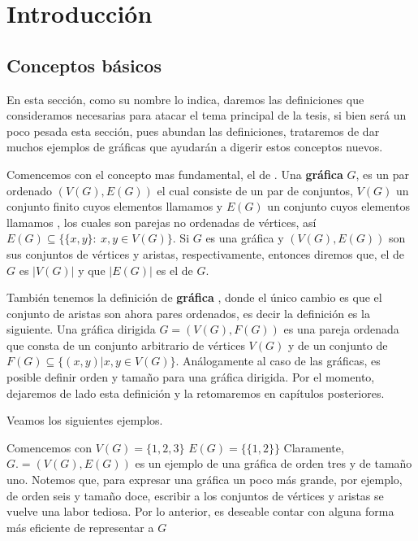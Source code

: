 \chapter{Introducci\'on}

\section{Conceptos básicos}
\label{sec:Cncpts bscs}

En esta sección, como su nombre lo indica, daremos las definiciones que consideramos necesarias para atacar el tema principal de la tesis, si bien será un poco pesada esta sección, pues abundan las definiciones, trataremos de dar muchos ejemplos de gráficas que ayudarán a digerir estos conceptos nuevos.

Comencemos con el concepto mas fundamental, el de .
Una \textbf{gr\'afica}  $G$, es un par ordenado $(V(G), E(G))$ el cual consiste de un par de conjuntos, $V(G)$ un conjunto finito cuyos elementos llamamos  y $E(G)$ un conjunto cuyos elementos llamamos , los cuales son parejas no ordenadas de vértices, así $E(G)\subseteq \{ \{x,y\} \colon\ x,y\in V(G) \}$.  Si $G$ es una gráfica y $(V(G),E(G))$ son sus conjuntos de vértices y aristas, respectivamente, entonces diremos que, el  de $G$ es $|V(G)|$ y que $|E(G)|$ es el  de $G$.

También tenemos la definición de \textbf{gr\'afica} , donde el único cambio es que el conjunto de aristas son ahora pares ordenados, es decir la definición es la siguiente. Una gráfica dirigida $G=(V(G),F(G))$ es una pareja ordenada que consta de un conjunto arbitrario de vértices $V(G)$ y de un conjunto de  $F(G)\subseteq \{ (x,y) | x,y\in V(G) \}$.   An\'alogamente al caso de las gr\'aficas, es posible definir orden y tama\~no para una gr\'afica dirigida.
Por el momento, dejaremos de lado esta definición y la retomaremos en capítulos posteriores.


Veamos los siguientes ejemplos.

Comencemos con
$V(G)=\{1,2,3\}$  $E(G)=\{ \{1,2\} \}$
Claramente, $G. = (V(G), E(G))$ es un ejemplo de una gráfica de orden tres y de tamaño uno.   Notemos que, para expresar una gr\'afica un poco m\'as grande, por ejemplo, de orden seis y tama\~no doce, escribir a los conjuntos de v\'ertices y aristas se vuelve una labor tediosa. Por lo anterior, es deseable contar con alguna forma m\'as eficiente de representar a $G$

